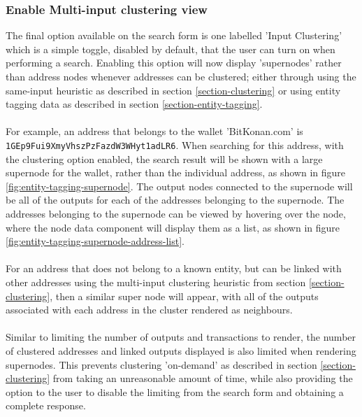 \subsubsection{Enable Multi-input clustering view}
The final option available on the search form is one labelled 'Input Clustering' which is a simple toggle, disabled by default, that the user can turn on when performing a search. Enabling this option will now display 'supernodes' rather than address nodes whenever addresses can be clustered; either through using the same-input heuristic as described in section \ref{section-clustering} or using entity tagging data as described in section \ref{section-entity-tagging}.
\\\\
For example, an address that belongs to the wallet 'BitKonan.com' is \\\texttt{1GEp9Fui9XmyVhszPzFazdW3WHyt1adLR6}. When searching for this address, with the clustering option enabled, the search result will be shown with a large supernode for the wallet, rather than the individual address, as shown in figure \ref{fig:entity-tagging-supernode}. The output nodes connected to the supernode will be all of the outputs for each of the addresses belonging to the supernode. The addresses belonging to the supernode can be viewed by hovering over the node, where the node data component will display them as a list, as shown in figure \ref{fig:entity-tagging-supernode-address-list}.
\\\\
For an address that does not belong to a known entity, but can be linked with other addresses using the multi-input clustering heuristic from section \ref{section-clustering}, then a similar super node will appear, with all of the outputs associated with each address in the cluster rendered as neighbours. 
\\\\
Similar to limiting the number of outputs and transactions to render, the number of clustered addresses and linked outputs displayed is also limited when rendering supernodes. This prevents clustering 'on-demand' as described in section \ref{section-clustering} from taking an unreasonable amount of time, while also providing the option to the user to disable the limiting from the search form and obtaining a complete response. 

